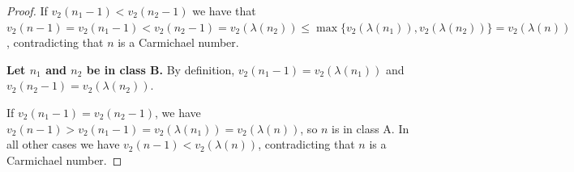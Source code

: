 \documentclass[10pt,a4paper]{amsart}
\begin{document}
\begin{proof}
If
$v_2(n_1
- 1)
<
v_2(n_2-1)$
we have that
$v_2(n-1)=v_2(n_1-1)
<
v_2(n_2-1)
=
v_2(\lambda(n_2))
\le \max\{v_2(\lambda(n_1)), v_2(\lambda(n_2))\} = v_2(\lambda(n))$, contradicting that
$n$ is a Carmichael number.

{\bf
 Let
$n_1$
and
$n_2$
be in class
B.}
By definition,
$v_2(n_1-1)
=
v_2(\lambda(n_1))$
and
$v_2(n_2-1)
=
v_2(\lambda(n_2))$.

If
$v_2(n_1
- 1) =
v_2(n_2-1)$,
we have
$v_2(n-1)
>
v_2(n_1-1)
=
v_2(\lambda(n_1))
=
v_2(\lambda(n))$,
so $n$ is in class A.
In all other cases we have
$v_2(n
-1)
<
v_2(\lambda(n))$,
contradicting that $n$ is a Carmichael number.
\end{proof}
\end{document}
